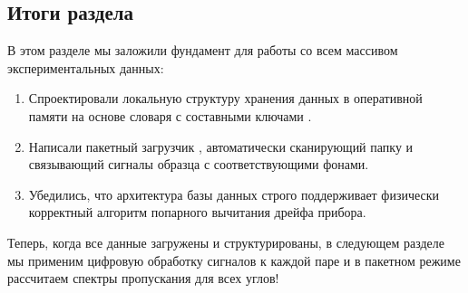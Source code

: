 \subsection{Итоги раздела}

В этом разделе мы заложили фундамент для работы со всем массивом экспериментальных данных:
\begin{enumerate}
    \item Спроектировали локальную структуру хранения данных в оперативной памяти на основе словаря с составными ключами .
    \item Написали пакетный загрузчик , автоматически сканирующий папку и связывающий сигналы образца с соответствующими фонами.
    \item Убедились, что архитектура базы данных строго поддерживает физически корректный алгоритм попарного вычитания дрейфа прибора.
\end{enumerate}

Теперь, когда все данные загружены и структурированы, в следующем разделе мы применим цифровую обработку сигналов к каждой паре и в пакетном режиме рассчитаем спектры пропускания для всех углов!
